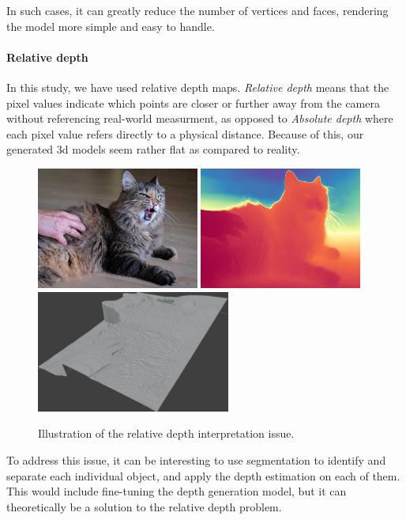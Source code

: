 \documentclass[12pt, letterpaper]{article}
\begin{document}
\begin{spacing}{1.15}
In such cases, it can greatly reduce the number of vertices and faces, rendering the model more simple and easy to handle.

\paragraph{Relative depth} In this study, we have used relative depth maps. \emph{Relative depth} means that the pixel values indicate which points are closer or further away from the camera
without referencing real-world measurment, as opposed to \emph{Absolute depth} where each pixel value refers directly to a physical distance.
Because of this, our generated 3d models seem rather flat as compared to reality.

\begin{figure}[!ht]
    \begin{center}
        \includegraphics[height = 4cm]{example_5}
        \includegraphics[height = 4cm]{example_5_pred_colored}
        \includegraphics[height = 4cm]{relative_example_5_pred}
        \caption{Illustration of the relative depth interpretation issue.}
        \label{relative}
    \end{center}
\end{figure}

To address this issue, it can be interesting to use segmentation to identify and separate each individual object, and apply the depth estimation
on each of them. This would include fine-tuning the depth generation model, but it can theoretically be a solution to the relative depth problem.


\end{spacing}
\end{document}

